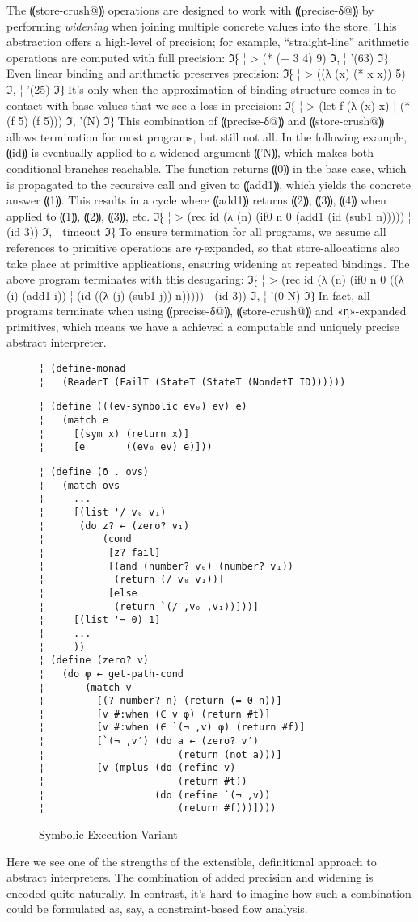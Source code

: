 The ⸨store-crush@⸩ operations are designed to work with ⸨precise-δ@⸩ by
performing \emph{widening} when joining multiple concrete values into the
store. This abstraction offers a high-level of precision; for example,
``straight-line'' arithmetic operations are computed with full precision:
ℑ⁅
¦ > (* (+ 3 4) 9)
ℑ,
¦ '(63)
ℑ⁆
Even linear binding and arithmetic preserves precision:
ℑ⁅
¦ > ((λ (x) (* x x)) 5)
ℑ,
¦ '(25)
ℑ⁆
It's only when the approximation of binding structure comes in to
contact with base values that we see a loss in precision:
ℑ⁅
¦ > (let f (λ (x) x)
¦     (* (f 5) (f 5)))
ℑ,
'(N)
ℑ⁆
This combination of ⸨precise-δ@⸩ and ⸨store-crush@⸩ allows termination for most
programs, but still not all. In the following example, ⸨id⸩ is eventually
applied to a widened argument ⸨'N⸩, which makes both conditional branches
reachable. The function returns ⸨0⸩ in the base case, which is propagated to
the recursive call and given to ⸨add1⸩, which yields the concrete answer ⸨1⸩.
This results in a cycle where ⸨add1⸩ returns ⸨2⸩, ⸨3⸩, ⸨4⸩ when applied to ⸨1⸩,
⸨2⸩, ⸨3⸩, etc.
ℑ⁅
¦ > (rec id (λ (n) (if0 n 0 (add1 (id (sub1 n)))))
¦     (id 3))
ℑ,
¦ timeout
ℑ⁆
To ensure termination for all programs, we assume all references to primitive
operations are $η$-expanded, so that store-allocations also take place at
primitive applications, ensuring widening at repeated bindings. The above
program terminates with this desugaring:
ℑ⁅
¦ > (rec id (λ (n) (if0 n 0 ((λ (i) (add1 i))
¦                            (id ((λ (j) (sub1 j)) n)))))
¦     (id 3))
ℑ,
¦ '(0 N)
ℑ⁆
In fact, all programs terminate when using ⸨precise-δ@⸩, ⸨store-crush@⸩ and
«η»-expanded primitives, which means we have a achieved a computable and
uniquely precise abstract interpreter.

\begin{figure} %
\begin{lstlisting}
¦ (define-monad
¦   (ReaderT (FailT (StateT (StateT (NondetT ID))))))
\end{lstlisting}
\figskip{}
\begin{lstlisting}
¦ (define (((ev-symbolic ev₀) ev) e)
¦   (match e
¦     [(sym x) (return x)]
¦     [e       ((ev₀ ev) e)]))
\end{lstlisting}
\figskip{}
\begin{lstlisting}
¦ (define (δ . ovs)
¦   (match ovs
¦     ...
¦     [(list '/ v₀ v₁)
¦      (do z? ← (zero? v₁)
¦          (cond
¦           [z? fail]
¦           [(and (number? v₀) (number? v₁))
¦            (return (/ v₀ v₁))]
¦           [else
¦            (return `(/ ,v₀ ,v₁))]))]
¦     [(list '¬ 0) 1]
¦     ...
¦     ))
¦ (define (zero? v)
¦   (do φ ← get-path-cond
¦       (match v
¦         [(? number? n) (return (= 0 n))]
¦         [v #:when (∈ v φ) (return #t)]
¦         [v #:when (∈ `(¬ ,v) φ) (return #f)]
¦         [`(¬ ,v′) (do a ← (zero? v′)
¦                       (return (not a)))]
¦         [v (mplus (do (refine v)
¦                       (return #t))
¦                   (do (refine `(¬ ,v))
¦                       (return #f)))])))
\end{lstlisting}
\caption{Symbolic Execution Variant}
\label{f:symbolic}
\end{figure} %

Here we see one of the strengths of the extensible, definitional approach to
abstract interpreters. The combination of added precision and widening is
encoded quite naturally. In contrast, it's hard to imagine how such a
combination could be formulated as, say, a constraint-based flow analysis.
